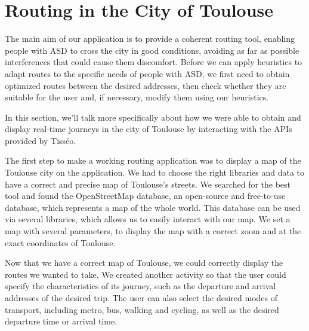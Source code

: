 
\section{Routing in the City of Toulouse}

The main aim of our application is to provide a coherent routing tool, enabling people with ASD to cross the city in good conditions, avoiding as far as possible interferences that could cause them discomfort. Before we can apply heuristics to adapt routes to the specific needs of people with ASD, we first need to obtain optimized routes between the desired addresses, then check whether they are suitable for the user and, if necessary, modify them using our heuristics.



In this section, we'll talk more specifically about how we were able to obtain and display real-time journeys in the city of Toulouse by interacting with the APIs provided by Tisséo.



The first step to make a working routing application was to display a map of the Toulouse city on the application. We had to choose the right libraries and data to have a correct and precise map of Toulouse's streets. We searched for the best tool and found the OpenStreetMap database, an open-source and free-to-use database, which represents a map of the whole world. This database can be used via several libraries, which allows us to easily interact with our map. We set a map with several parameters, to display the map with a correct zoom and at the exact coordinates of Toulouse.



Now that we have a correct map of Toulouse, we could correctly display the routes we wanted to take. We created another activity so that the user could specify the characteristics of its journey, such as the departure and arrival addresses of the desired trip. The user can also select the desired modes of transport, including metro, bus, walking and cycling, as well as the desired departure time or arrival time.




